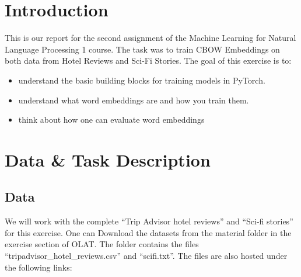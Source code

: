 \documentclass[fleqn,10pt]{SelfArx} %
\begin{document}
\maketitle %

\tableofcontents %

\thispagestyle{empty} %


\section{Introduction} %
This is our report for the second assignment of the Machine Learning for Natural Language Processing 1 course. The task was to train CBOW Embeddings on both data from Hotel Reviews and Sci-Fi Stories. The goal of this exercise is to:
\begin{itemize}[noitemsep] %
	\item understand the basic building blocks for training models in PyTorch.
	\item understand what word embeddings are and how you train them.
	\item think about how one can evaluate word embeddings
\end{itemize}


\section{Data \& Task Description}

\subsection{Data}
We will work with the complete “Trip Advisor hotel reviews” and “Sci-fi stories” for this exercise. One can Download the datasets from the material folder in the exercise section of OLAT. The folder contains the files “tripadvisor\_hotel\_reviews.csv” and “scifi.txt”. The files are also hosted under the following links:
\end{document}
